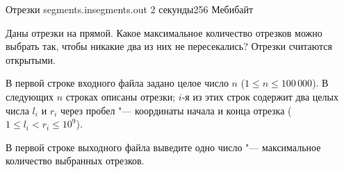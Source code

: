 
\begin{problem}{Отрезки}
{segments.in}{segments.out}
{2 секунды}{256 Мебибайт}

Даны отрезки на прямой. Какое максимальное количество отрезков можно выбрать
так, чтобы никакие два из них не пересекались? Отрезки считаются открытыми.

\InputFile

В первой строке входного файла задано целое число $n$
($1 \le n \le 100\,000$). В следующих $n$ строках описаны отрезки;
$i$-я из этих строк содержит два целых числа $l_i$ и $r_i$ через пробел "---
координаты начала и конца отрезка ($1 \le l_i < r_i \le 10^9$).

\OutputFile

В первой строке выходного файла выведите одно число "--- максимальное
количество выбранных отрезков.

\Examples

\begin{example}
%
%
%
\end{example}

\end{problem}
